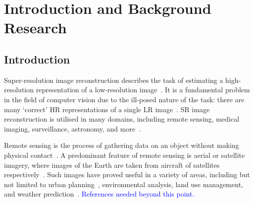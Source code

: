 \chapter{Introduction and Background Research}

\label{chapter1}

\section{Introduction}

Super-resolution image reconstruction describes the task of estimating a high-resolution representation of a low-resolution image~\cite{superResOverview}. It is a fundamental problem in the field of computer vision due to the ill-posed nature of the task: there are many `correct' HR representations of a single LR image~\cite{superResChallenges,superResRemoteSensingOverview}. SR image reconstruction is utilised in many domains, including remote sensing, medical imaging, surveillance, astronomy, and more~\cite{superResRemoteSensingChallenges, superResRemoteSensingOverview, superResMedicalImaging, superResSurveillance, superResAstronomy, superResUses}.

Remote sensing is the process of gathering data on an object without making physical contact~\cite{remoteSensing}. A predominant feature of remote sensing is aerial or satellite imagery, where images of the Earth are taken from aircraft of satellites respectively~\cite{ref}. Such images have proved useful in a variety of areas, including but not limited to urban planning~\cite{remoteSensingUses}, environmental analysis, land use management, and weather prediction~\cite{remoteSensingGANsReview}. \textcolor{blue}{References needed beyond this point.}

